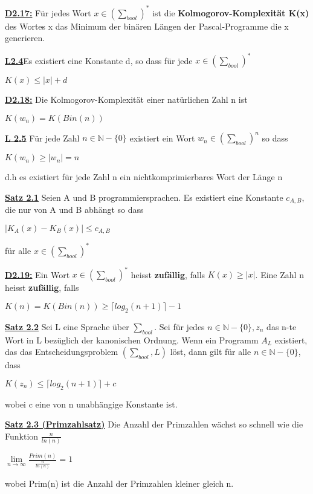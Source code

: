 \documentclass[8pt]{extreport}
\begin{document}
\underline{\textbf{D2.17:}} Für jedes Wort $x \in (\sum_{bool})^*$ ist die \textbf{Kolmogorov-Komplexität K(x)} des Wortes x das Minimum der binären Längen der Pascal-Programme die x generieren.

\underline{\textbf{L2.4}}Es existiert eine Konstante d, so dass für jede $x \in (\sum_{bool})^*$
\begin{center}
$K(x) \leq |x|+d$
\end{center}

\underline{\textbf{D2.18:}} Die Kolmogorov-Komplexität einer natürlichen Zahl n ist 
\begin{center}
$K(w_n) = K(Bin(n))$
\end{center} 

\underline{\textbf{L 2.5}} Für jede Zahl $n \in \mathbb{N}-\{0\}$ existiert ein Wort $w_n \in (\sum_{bool})^n$ so dass
\begin{center}
$K(w_n) \geq |w_n| = n$
\end{center}
d.h es existiert für jede Zahl n ein nichtkomprimierbares Wort der Länge n

\underline{\textbf{Satz 2.1}} Seien A und B programmiersprachen. Es existiert eine Konstante $c_{A,B}$, die nur von A und B abhängt so dass
\begin{center}
$|K_A(x) -K_B(x)| \leq c_{A,B}$
\end{center}
für alle $x \in (\sum_{bool})^*$

\underline{\textbf{D2.19:}} Ein Wort $x \in (\sum_{bool})^*$ heisst \textbf{zufällig}, falls $K(x) \geq |x|$. Eine Zahl n heisst \textbf{zufällig}, falls 
\begin{center}
$K(n) = K(Bin(n)) \geq \lceil log_2(n+1)\rceil -1$
\end{center} 

\underline{\textbf{Satz 2.2}} Sei L eine Sprache über $\sum_{bool}$. Sei für jedes $n \in \mathbb{N}-\{0\}, z_n$ das n-te Wort in L bezüglich der kanonischen Ordnung. Wenn ein Programm $A_L$ existiert, das das Entscheidungsproblem $(\sum_{bool},L)$ löst, dann gilt für alle $n\in \mathbb{N}-\{0\}$, dass
\begin{center}
$K(z_n) \leq \lceil log_2(n+1) \rceil + c$
\end{center}
wobei c eine von n unabhängige Konstante ist.

\underline{\textbf{Satz 2.3 (Primzahlsatz)}}  Die Anzahl der Primzahlen wächst so schnell wie die Funktion $\frac{n}{ln(n)}$
\begin{center}
$\lim\limits_{n \to \infty} \frac{Prim(n)}{\frac{n}{ln(n)}} = 1$
\end{center}
wobei Prim(n) ist die Anzahl der Primzahlen kleiner gleich n.
\end{document}
